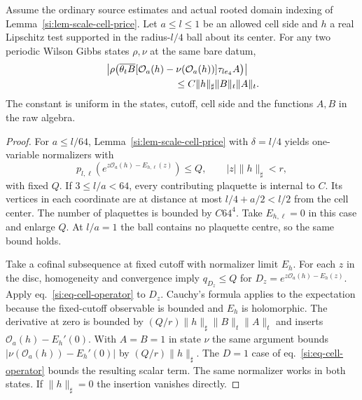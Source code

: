 \documentclass[11pt,letterpaper,reqno]{amsart}
\makeatletter
\numberwithin{equation}{section}
\renewcommand{\eqref}[1]{\textup{eq.~\ref{#1}}}
\theoremstyle{definition}
\newcommand{\ms@majorstart}{%
  \pushQED{\qed}\renewcommand{\qedsymbol}{$\blacksquare\square$}}
\newenvironment{theorem}[1][]{\ms@majorstart\ms@theorem[#1]}
  {\popQED\endms@theorem}
\theoremstyle{remark}
\makeatother
\begin{document}
\begin{samepage}
\begin{theorem}[A centered lattice insertion]\label{si:thm-lattice-insertion}
Assume the ordinary source estimates and actual rooted domain
indexing of Lemma~\ref{si:lem-scale-cell-price}. Let $a\le l\le1$ be an
allowed cell side and $h$ a real Lipschitz test supported in the
radius-$l/4$ ball about its center. For any two periodic Wilson
Gibbs states $\rho,\nu$ at the same bare datum,
\begin{equation}\label{si:eq-lattice-insertion}
 \begin{aligned}
 &\left|\rho\!\left(\overline{\theta_tB}
    [\mathcal O_a(h)-\nu(\mathcal O_a(h))]\tau_{le_4}A\right)\right|\\
 &\hspace{25mm}\le C\|h\|_\sharp\|B\|_t\|A\|_t .
 \end{aligned}
\end{equation}
The constant is uniform in the states, cutoff, cell side and
the functions $A,B$ in the raw algebra.
\end{theorem}
\end{samepage}

\begin{proof}
For $a\le l/64$, Lemma~\ref{si:lem-scale-cell-price} with
$\delta=l/4$ yields one-variable normalizers with
\[
 p_{l,\ell}(e^{z\mathcal O_a(h)-E_{h,\ell}(z)})\le Q,
              \qquad |z|\|h\|_\sharp<r,
\]
with fixed $Q$. If $3\le l/a<64$,
every contributing plaquette is internal to $C$. Its vertices
in each coordinate are at distance at most $l/4+a/2<l/2$
from the cell center. The number of plaquettes is bounded by
$C64^4$. Take $E_{h,\ell}=0$ in this case and enlarge $Q$.
At $l/a=1$ the ball contains no plaquette centre, so the same
bound holds.

Take a cofinal subsequence at fixed cutoff with normalizer
limit $E_h$. For each $z$ in the disc, homogeneity and
convergence imply $q_{D_z}\le Q$ for
$D_z=e^{z\mathcal O_a(h)-E_h(z)}$. Apply
\eqref{si:eq-cell-operator} to $D_z$. Cauchy's formula applies
to the expectation because the fixed-cutoff observable is
bounded and $E_h$ is holomorphic. The derivative at zero is
bounded by $(Q/r)\|h\|_\sharp\|B\|_t\|A\|_t$ and inserts
$\mathcal O_a(h)-E_h'(0)$. With $A=B=1$ in state $\nu$ the
same argument bounds $|\nu(\mathcal O_a(h))-E_h'(0)|$ by
$(Q/r)\|h\|_\sharp$. The $D=1$ case of
\eqref{si:eq-cell-operator} bounds the resulting scalar term.
The same normalizer works in both states. If $\|h\|_\sharp=0$
the insertion vanishes directly.
\end{proof}
\end{document}

